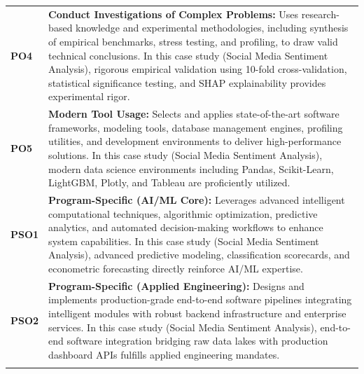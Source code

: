 {\begin{longtable}{@{}>{\centering\arraybackslash}p{1.8cm} p{13.2cm}@{}}
    \addlinespace
\textbf{PO4} & \textbf{Conduct Investigations of Complex Problems:} Uses research-based knowledge and experimental methodologies, including synthesis of empirical benchmarks, stress testing, and profiling, to draw valid technical conclusions. In this case study (Social Media Sentiment Analysis), rigorous empirical validation using 10-fold cross-validation, statistical significance testing, and SHAP explainability provides experimental rigor. \\
    \addlinespace
\textbf{PO5} & \textbf{Modern Tool Usage:} Selects and applies state-of-the-art software frameworks, modeling tools, database management engines, profiling utilities, and development environments to deliver high-performance solutions. In this case study (Social Media Sentiment Analysis), modern data science environments including Pandas, Scikit-Learn, LightGBM, Plotly, and Tableau are proficiently utilized. \\
    \addlinespace
\textbf{PSO1} & \textbf{Program-Specific (AI/ML Core):} Leverages advanced intelligent computational techniques, algorithmic optimization, predictive analytics, and automated decision-making workflows to enhance system capabilities. In this case study (Social Media Sentiment Analysis), advanced predictive modeling, classification scorecards, and econometric forecasting directly reinforce AI/ML expertise. \\
    \addlinespace
\textbf{PSO2} & \textbf{Program-Specific (Applied Engineering):} Designs and implements production-grade end-to-end software pipelines integrating intelligent modules with robust backend infrastructure and enterprise services. In this case study (Social Media Sentiment Analysis), end-to-end software integration bridging raw data lakes with production dashboard APIs fulfills applied engineering mandates. \\
    \addlinespace
    \bottomrule
\end{longtable}}